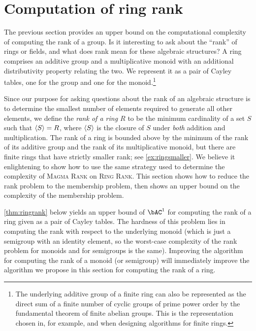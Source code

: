 \section{Computation of ring rank}

%
The previous section provides an upper bound on the computational complexity of computing the rank of a group.
Is it interesting to ask about the ``rank'' of rings or fields, and what does rank mean for these algebraic structures?
A ring comprises an additive group and a multiplicative monoid with an additional distributivity property relating the two.
We represent it as a pair of Cayley tables, one for the group and one for the monoid.\footnote{
  The underlying additive group of a finite ring can also be represented as the direct sum of a finite number of cyclic groups of prime power order by the fundamental theorem of finite abelian groups.
  This is the representation chosen in, for example, \autocite{av05} and \autocite{ks06}  when designing algorithms for finite rings.
}

Since our purpose for asking questions about the rank of an algebraic structure is to determine the smallest number of elements required to generate all other elements, we define the \emph{rank of a ring $R$} to be the minimum cardinality of a set $S$ such that $\langle S \rangle = R$, where $\langle S \rangle$ is the closure of $S$ under \emph{both} addition and multiplication.
The rank of a ring is bounded above by the minimum of the rank of its additive group and the rank of its multiplicative monoid, but there are finite rings that have strictly smaller rank; see \autoref{ex:ringsmaller}.
We believe it enlightening to show how to use the same strategy used to determine the complexity of \textsc{Magma Rank} on \textsc{Ring Rank}.
This section shows how to reduce the rank problem to the membership problem, then shows an upper bound on the complexity of the membership problem.

%
\autoref{thm:ringrank} below yields an upper bound of $\bAC^1$ for computing the rank of a ring given as a pair of Cayley tables.
The hardness of this problem lies in computing the rank with respect to the underlying monoid (which is just a semigroup with an identity element, so the worst-case complexity of the rank problem for monoids and for semigroups is the same).
Improving the algorithm for computing the rank of a monoid (or semigroup) will immediately improve the algorithm we propose in this section for computing the rank of a ring.

